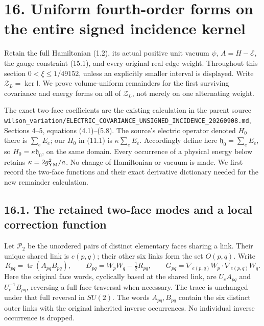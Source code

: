 \documentclass[
]{article}
\begin{document}
\section{16. Uniform fourth-order forms on the entire signed incidence
kernel}\label{uniform-fourth-order-forms-on-the-entire-signed-incidence-kernel}

Retain the full Hamiltonian (1.2), its actual positive unit vacuum
\(\psi\), \(A=H-\mathcal E\), the gauge constraint (15.1), and every
original real edge weight. Throughout this section \(0<\xi\le1/49152\),
unless an explicitly smaller interval is displayed. Write
\(\mathscr Z_L=\ker\mathsf I\). We prove volume-uniform remainders for
the first surviving covariance and energy forms on all of
\(\mathscr Z_L\), not merely on one alternating weight.

The exact two-face coefficients are the existing calculation in the
parent source
\nolinkurl{wilson_variation/ELECTRIC_COVARIANCE_UNSIGNED_INCIDENCE_20260908.md},
Sections 4--5, equations (4.1)--(5.8). The source's electric operator
denoted \(H_0\) there is \(\sum_eE_e\); our \(H_0\) in (11.1) is
\(\kappa\sum_eE_e\). Accordingly define here
\(\mathfrak h_0=\sum_eE_e\), so \(H_0=\kappa\mathfrak h_0\), on the same
domain. Every occurrence of a physical energy below retains
\(\kappa=2g_{\rm YM}^2/a\). No change of Hamiltonian or vacuum is made.
We first record the two-face functions and their exact derivative
dictionary needed for the new remainder calculation.

\subsection{16.1. The retained two-face modes and a local correction
function}\label{the-retained-two-face-modes-and-a-local-correction-function}

Let \(\mathscr P_2\) be the unordered pairs of distinct elementary faces
sharing a link. Their unique shared link is \(e(p,q)\); their other six
links form the set \(O(p,q)\). Write \[
R_{pq}=\operatorname{tr}(A_{pq}B_{pq}),\qquad
D_{pq}=W_pW_q-\tfrac12R_{pq},\qquad
G_{pq}=\nabla_{e(p,q)}W_p\cdot\nabla_{e(p,q)}W_q .
\] Here the original face words, cyclically based at the shared link,
are \(U_eA_{pq}\) and \(U_e^{-1}B_{pq}\), reversing a full face
traversal when necessary. The trace is unchanged under that full
reversal in \(SU(2)\). The words \(A_{pq},B_{pq}\) contain the six
distinct outer links with the original inherited inverse occurrences. No
individual inverse occurrence is dropped.
\end{document}
